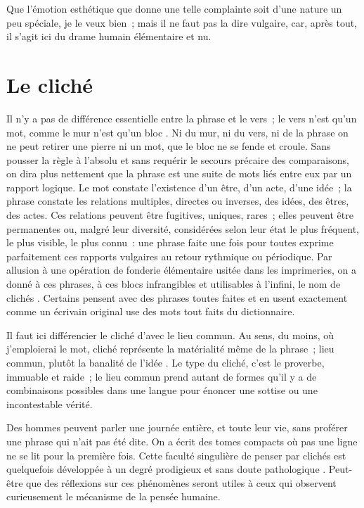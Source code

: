 \documentclass[french,twoside]{book} %
\newcommand\chapteropen{} %
\newcommand\chaptercont{} %
\newcommand\chapterclose{} %
\begin{document}
\noindent Que l’émotion esthétique que donne une telle complainte soit d’une nature un peu spéciale, je le veux bien ; mais il ne faut pas la dire vulgaire, car, après tout, il s’agit ici du drame humain élémentaire et nu.
\chapterclose


\chapteropen
\chapter[{Le cliché}]{Le cliché }\renewcommand{\leftmark}{Le cliché }


\chaptercont
\noindent Il n’y a pas de différence essentielle entre la phrase et le vers ; le vers n’est qu’un mot, comme le mur n’est qu’un bloc . Ni du mur, ni du vers, ni de la phrase on ne peut retirer une pierre ni un mot, que le bloc ne se fende et croule. Sans pousser la règle à l’absolu et sans requérir le secours précaire des comparaisons, on dira plus nettement que la phrase est une suite de mots liés entre eux par un rapport logique. Le mot constate l’existence d’un être, d’un acte, d’une idée ; la phrase constate les relations multiples, directes ou inverses, des idées, des êtres, des actes. Ces relations peuvent être fugitives, uniques, rares ; elles peuvent être permanentes ou, malgré leur diversité, considérées selon leur état le plus fréquent, le plus visible, le plus connu : une phrase faite une fois pour toutes exprime parfaitement ces rapports vulgaires au retour rythmique ou périodique. Par allusion à une opération de fonderie élémentaire usitée dans les imprimeries, on a donné à ces phrases, à ces blocs infrangibles et utilisables à l’infini, le nom de clichés . Certains pensent avec des phrases toutes faites et en usent exactement comme un écrivain original use des mots tout faits du dictionnaire.\par
Il faut ici différencier le cliché d’avec le lieu commun. Au sens, du moins, où j’emploierai le mot, cliché représente la matérialité même de la phrase ; lieu commun, plutôt la banalité de l’idée . Le type du cliché, c’est le proverbe, immuable et raide ; le lieu commun prend autant de formes qu’il y a de combinaisons possibles dans une langue pour énoncer une sottise ou une incontestable vérité.\par
Des hommes peuvent parler une journée entière, et toute leur vie, sans proférer une phrase qui n’ait pas été dite. On a écrit des tomes compacts où pas une ligne ne se lit pour la première fois. Cette faculté singulière de penser par clichés est quelquefois développée à un degré prodigieux et sans doute pathologique . Peut-être que des réflexions sur ces phénomènes seront utiles à ceux qui observent curieusement le mécanisme de la pensée humaine.\par
\end{document}
